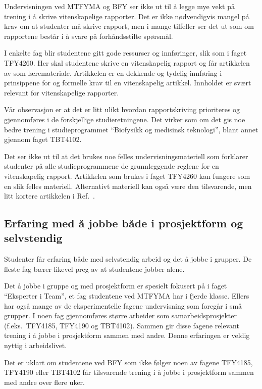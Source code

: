 \documentclass{article}
\begin{document}
Undervisningen ved MTFYMA og BFY ser ikke ut til å legge mye vekt på trening i å skrive vitenskapelige rapporter. Det er ikke nødvendigvis mangel på krav om at studenter må skrive rapport, men i mange tilfeller ser det ut som om rapportene består i å svare på forhåndsstilte spørsmål.

I enkelte fag blir studentene gitt gode ressurser og innføringer, slik som i faget TFY4260. Her skal studentene skrive en vitenskapelig rapport og får artikkelen av \citet{Ecarnot2015} som læremateriale. Artikkelen er en dekkende og tydelig innføring i prinsippene for og formelle krav til en vitenskapelig artikkel. Innholdet er svært relevant for vitenskapelige rapporter.

Vår observasjon er at det er litt ulikt hvordan rapportskriving prioriteres og gjennomføres i de forskjellige studieretningene. Det virker som om det gis noe bedre trening i studieprogrammet ``Biofysikk og medisinsk teknologi'', blant annet gjennom faget TBT4102.

Det ser ikke ut til at det brukes noe felles undervisningsmateriell som forklarer studenter på alle studieprogrammene de grunnleggende reglene for en vitenskapelig rapport. Artikkelen som brukes i faget TFY4260 kan fungere som en slik felles materiell. Alternativt materiell kan også være den tilsvarende, men litt kortere artikkelen i Ref.~\cite{Senturia2003}.




\subsection{Erfaring med å jobbe både i prosjektform og selvstendig}
Studenter får erfaring både med selvstendig arbeid og det å jobbe i grupper. De fleste fag bærer likevel preg av at studentene jobber alene.

Det å jobbe i gruppe og med prosjektform er spesielt fokusert på i faget ``Eksperter i Team'', et fag studentene ved MTFYMA har i fjerde klasse. Ellers har også mange av de eksperimentelle fagene undervisning som foregår i små grupper. I noen fag gjennomføres større arbeider som samarbeidsprosjekter (f.eks.~TFY4185, TFY4190 og TBT4102). Sammen gir disse fagene relevant trening i å jobbe i prosjektform sammen med andre. Denne erfaringen er veldig nyttig i arbeidslivet.

Det er uklart om studentene ved BFY som ikke følger noen av fagene TFY4185, TFY4190 eller TBT4102 får tilsvarende trening i å jobbe i prosjektform sammen med andre over flere uker.
\end{document}
